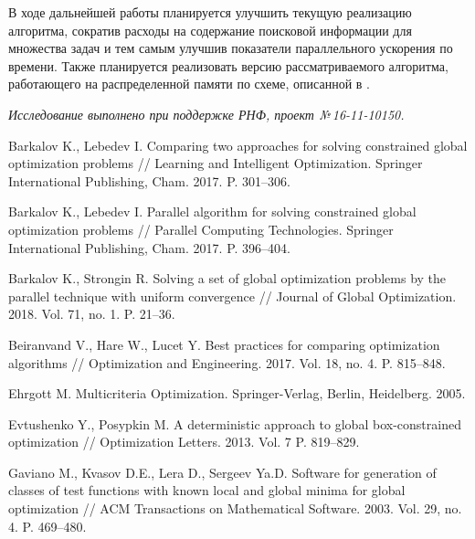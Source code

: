 \documentclass{cmi}
\begin{document}
В ходе дальнейшей работы планируется улучшить текущую реализацию алгоритма,
сократив расходы на содержание поисковой информации для множества задач и тем самым улучшив
показатели параллельного ускорения по времени. Также планируется реализовать версию
рассматриваемого алгоритма, работающего на распределенной памяти по схеме, описанной в \cite{BarkalovLebedev2017_2}.

\vspace{1em}
{\it Исследование выполнено при поддержке РНФ, проект №\,16-11-10150.}

\begin{biblio}
  Barkalov K., Lebedev I.
  \newblock Comparing two approaches for solving constrained global optimization
    problems
  \newblock // Learning and Intelligent Optimization. Springer International
    Publishing, Cham. 2017. P. 301--306.
  \newblock {}

  Barkalov K., Lebedev I.
  \newblock Parallel algorithm for solving constrained global optimization
    problems
  \newblock // Parallel Computing Technologies. Springer International
    Publishing, Cham. 2017. P. 396--404.
  \newblock {}

  Barkalov K., Strongin R.
  \newblock Solving a set of global optimization problems by the parallel
    technique with uniform convergence //
  \newblock Journal of Global Optimization. 2018. Vol. 71, no. 1. P. 21--36.
  \newblock {}

  Beiranvand V., Hare W., Lucet Y.
  \newblock Best practices for comparing optimization algorithms //
  \newblock Optimization and Engineering. 2017. Vol. 18, no. 4. P. 815--848.
  \newblock {}

  Ehrgott M.
  \newblock Multicriteria Optimization.
  \newblock Springer-Verlag, Berlin, Heidelberg. 2005.
  \newblock {}

  Evtushenko Y., Posypkin M.
  \newblock A deterministic approach to global box-constrained optimization //
  \newblock Optimization Letters. 2013. Vol. 7 P. 819--829.
  \newblock {}

  {Gaviano M., Kvasov D.E., Lera D., Sergeev Ya.D.}
  \newblock Software for generation of classes of test functions with known local
    and global minima for global optimization //
  \newblock ACM Transactions on Mathematical Software. 2003. Vol. 29, no. 4. P.
    469--480.
  \newblock {}


\end{biblio}
\end{document}
